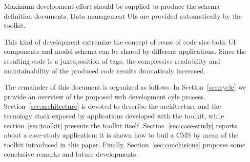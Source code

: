 Maximum development effort should be supplied to produce the schema definition documents. Data management UIs are provided automatically by the toolkit.

This kind of development extremize the concept of reuse of code sice both UI components and model schema can be shared by different applications. Since the resulting code is a juxtaposition of tags, the complessive readability and maintainability of the produced code results dramaticaly increased.

The remainder of this document is organized as follows. In
Section~\ref{sec:cycle} we provide an overview of the proposed web development cyle process. Section~\ref{sec:architecture} is devoted to describe the architecture and the tecnology stack exposed by applications developed with the toolkit, while section~\ref{sec:toolkit} presents the toolkit itself. Section~\ref{sec:case-study} reports about a case-study application: it is shown how to buil a CMS by mean of the toolkit introduced in this paper. Finally, Section~\ref{sec:conclusions} proposes some conclusive remarks and future developments.

